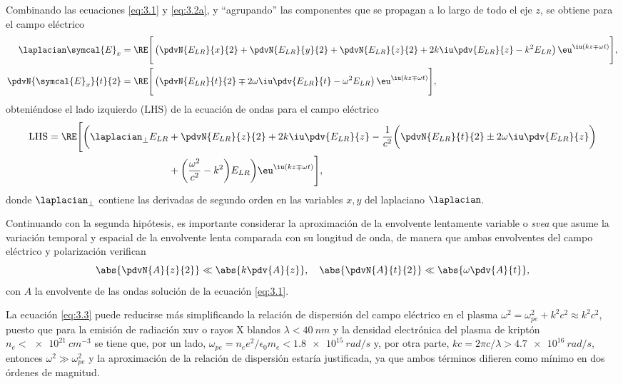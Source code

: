 Combinando las ecuaciones \eqref{eq:3.1} y \eqref{eq:3.2a}, y \enquote{agrupando} las componentes que se propagan a lo largo de todo el eje $z$, se obtiene para el campo eléctrico
\begin{align}
  \laplacian \symcal{E}_{x} 
  &= 
  \RE \Bigg[\left(\pdvN{E_{LR}}{x}{2} + \pdvN{E_{LR}}{y}{2} + \pdvN{E_{LR}}{z}{2} + 2k \iu \pdv{E_{LR}}{z} - k^{2}E_{LR}\right)\eu^{\iu (kz \mp \omega t)}\Bigg], \\
  \pdvN{\symcal{E}_{x}}{t}{2}
  &= 
  \RE \Bigg[\left(\pdvN{E_{LR}}{t}{2} \mp 2 \omega \iu \pdv{E_{LR}}{t} - \omega^{2}E_{LR}\right)\eu^{\iu (kz \mp \omega t)}\Bigg],
\end{align}
obteniéndose el lado izquierdo ($\mathrm{LHS}$) de la ecuación de ondas para el campo eléctrico
\begin{equation}\label{eq:3.3}
  \begin{split}
    \mathrm{LHS} = \RE \Bigg[\bigg(\laplacian_{\perp}E_{LR} &+ \pdvN{E_{LR}}{z}{2} + 2k \iu \pdv{E_{LR}}{z} - \frac{1}{c^{2}}\bigg(\pdvN{E_{LR}}{t}{2} \pm 2 \omega \iu \pdv{E_{LR}}{z}\bigg) \\ &+  \bigg(\frac{\omega^{2}}{c^{2}} - k^{2}\bigg)E_{LR}\bigg)\eu^{\iu(kz \mp \omega t)}\Bigg],
  \end{split}
\end{equation}
donde $\laplacian_{\perp}$ contiene las derivadas de segundo orden en las variables $x, y$ del laplaciano $\laplacian $.

Continuando con la segunda hipótesis, es importante considerar la aproximación de la envolvente lentamente variable o \emph{\acrfull{svea}} que asume la variación temporal y espacial de la envolvente lenta\autocite{Larroche2000} comparada con su longitud de onda, de manera que ambas envolventes del campo eléctrico y polarización verifican
\begin{equation}\label{eq:3.4}
  \abs{\pdvN{A}{z}{2}} \ll \abs{k \pdv{A}{z}}, \quad \abs{\pdvN{A}{t}{2}} \ll \abs{\omega \pdv{A}{t}},
\end{equation}
con $A$ la envolvente de las ondas solución de la ecuación \eqref{eq:3.1}. 

La ecuación \eqref{eq:3.3} puede reducirse más simplificando la relación de dispersión del campo eléctrico en el plasma $\omega^{2} = \omega^{2}_{pe} + k^{2}c^{2}\approx k^{2}c^{2}$, puesto que para la emisión de radiación \acrshort{xuv} o rayos X blandos $\lambda<\qty{40}{nm}$ y la densidad electrónica del plasma de kriptón $n_e<\qty{e21}{cm^{-3}}$ se tiene que, por un lado, $\omega_{pe}=n_{e}e^{2}/\epsilon_{0}m_{e}<\qty{1,8e15}{rad/s}$ y, por otra parte, $kc=2 \pi c/\lambda>\qty{4,7e16}{rad/s}$, entonces $\omega^{2} \gg \omega_{pe}^{2}$ y la aproximación de la relación de dispersión estaría justificada, ya que ambos términos difieren como mínimo en dos órdenes de magnitud. 

